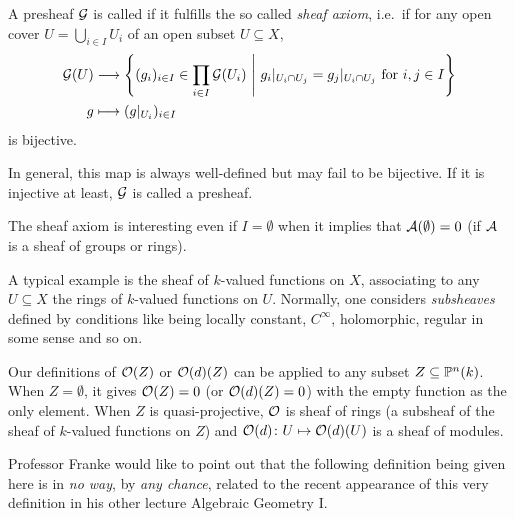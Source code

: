 \documentclass[a4paper,parskip=half,numbers=enddot, DIV=12]{scrreprt}
\begin{document}
\begin{defi}[Sheaf]
    A presheaf $\mathcal{G}$ is called  if it fulfills the so called \emph{sheaf axiom}, i.e.\ if for any open cover $U = \bigcup_{i\in I} U_i$ of an open subset $U\subseteq X$,
    \begin{align*}
        \Gg(U) &\morphism \left\{(g_i)_{i\in I}\in \prod_{i\in I} \Gg(U_i)\st g_i|_{U_i\cap U_j} = g_j|_{U_i\cap U_j} \text{ for } i,j\in I\right\}\\
        g& \longmapsto (g|_{U_i})_{i\in I}
    \end{align*}
    is bijective. 
    
    In general, this map is always well-defined but may fail to be bijective. If it is injective at least, $\mathcal{G}$ is called a  presheaf.
\end{defi}
\begin{rem}
    \begin{alphanumerate}
        \item 
            The sheaf axiom is interesting even if $I=\emptyset$ when it implies that $\mathcal{A}(\emptyset) = 0$ (if $\mathcal{A}$ is a sheaf of groups or rings).
        \item
            A typical example is the sheaf of $k$-valued functions on $X$, associating to any $U\subseteq X$ the rings of $k$-valued functions on $U$. Normally, one considers \emph{subsheaves} defined by conditions like being locally constant, $C^\infty$, holomorphic, regular in some sense and so on.
        \item 
            Our definitions of $\mathcal{O}(Z)$ or $\mathcal{O}(d)(Z)$ can be applied to any subset $Z\subseteq \mathbb{P}^n(k)$. When $Z=\emptyset$, it gives $\mathcal{O}(Z) = 0$ (or $\mathcal{O}(d)(Z) = 0$) with the empty function as the only element. When $Z$ is quasi-projective, $\mathcal{O}$ is sheaf of rings (a subsheaf of the sheaf of $k$-valued functions on $Z$) and $\mathcal{O}(d)\colon U\mapsto \mathcal{O}(d)(U)$ is a sheaf of modules.
    \end{alphanumerate}
\end{rem}

Professor Franke would like to point out that the following definition being given here is in \emph{no way}, by \emph{any chance}, related to the recent appearance of this very definition in his other lecture Algebraic Geometry I.
\end{document}
